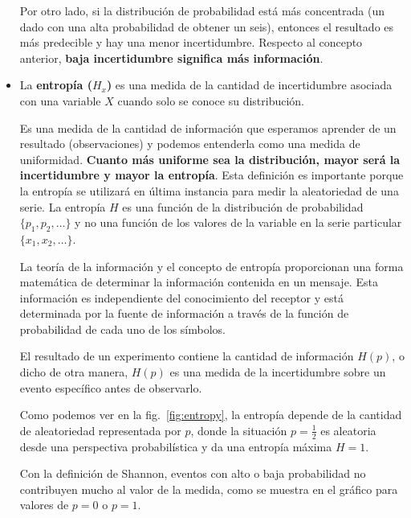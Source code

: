 \documentclass[a4paper,12pt]{article}
\begin{document}
\begin{itemize}[noitemsep, topsep=2pt]
	      Por otro lado, si la distribución de probabilidad está más concentrada (un dado con una alta probabilidad de obtener un seis), entonces el resultado es más predecible y hay una menor incertidumbre. Respecto al concepto anterior, \textbf{baja incertidumbre significa más información}. 
	      
	\item La \textbf{entropía ($H_x$)} es una medida de la cantidad de incertidumbre asociada con una variable $X$ cuando solo se conoce su distribución. 
	      
	      Es una medida de la cantidad de información que esperamos aprender de un resultado (observaciones) y podemos entenderla como una medida de uniformidad. \textbf{Cuanto más uniforme sea la distribución, mayor será la incertidumbre y mayor la entropía}. Esta definición es importante porque la entropía se utilizará en última instancia para medir la aleatoriedad de una serie. La entropía $H$ es una función de la distribución de probabilidad $\{p_1, p_2, \dots \}$ y no una función de los valores de la variable en la serie particular $\{x_1, x_2, \dots\}$. 
	      
	      La teoría de la información y el concepto de entropía proporcionan una forma matemática de determinar la información contenida en un mensaje. Esta información es independiente del conocimiento del receptor y está determinada por la fuente de información a través de la función de probabilidad de cada uno de los símbolos. 
	      
	      El resultado de un experimento contiene la cantidad de información $H(p)$, o dicho de otra manera, $H(p)$ es una medida de la incertidumbre sobre un evento específico antes de observarlo.
	      
	      Como podemos ver en la fig.~\ref{fig:entropy}, la entropía depende de la cantidad de aleatoriedad representada por $p$, donde la situación $p = \frac{1}{2}$ es aleatoria desde una perspectiva probabilística y da una entropía máxima $H=1$.
	      
	      \clearpage
	      
	      Con la definición de Shannon, eventos con alto o baja probabilidad no contribuyen mucho al valor de la medida, como se muestra en el gráfico para valores de $p =0$ o $p=1$.
	      
\end{itemize}
\end{document}
